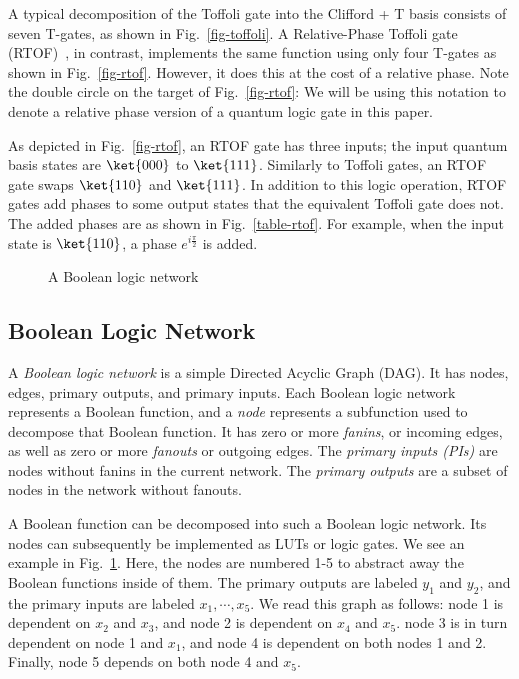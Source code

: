A typical decomposition of the Toffoli gate into the Clifford + T basis
consists of seven T-gates, as shown in Fig.~\ref{fig-toffoli}.
A Relative-Phase Toffoli gate (RTOF)~\cite{bib-selinger-rtof}, in contrast,
implements the same function using only four T-gates as shown in
Fig.~\ref{fig-rtof}. However, it does this at the cost of a relative phase.
Note the double circle on the target of Fig.~\ref{fig-rtof}: We will be
using this notation to denote a relative phase version of a quantum logic
gate in this paper. 

As depicted in Fig.~\ref{fig-rtof}, an RTOF gate has three inputs; the input quantum basis states are $\ket{000}$
to $\ket{111}$. Similarly to Toffoli gates, an RTOF gate swaps $\ket{110}$ and $\ket{111}$. In addition to this
logic operation, RTOF gates add phases to some output states that the equivalent Toffoli gate does not. The added
phases are as shown in Fig.~\ref{table-rtof}. For example, when the input state is $\ket{110}$, a phase $e^{i\frac{\pi}{2}}$ is added.

\begin{figure}[t]
    \centering
    
    \caption{A Boolean logic network}
    \label{fig-lut-network}
\end{figure}

\subsection{Boolean Logic Network}

A {\it Boolean logic network} is a simple Directed Acyclic Graph (DAG). It has nodes, edges, primary outputs, and
primary inputs. Each Boolean logic network represents a Boolean function, and a
\emph{node} represents a subfunction used to decompose that Boolean function. It has zero or more {\it fanins}, or incoming edges, as well as zero or more {\it fanouts} or outgoing edges.
The {\it primary inputs (PIs)} are nodes without fanins in the current network. The {\it primary outputs} are a
subset of nodes in the network without fanouts. 

A Boolean function can be decomposed into such a Boolean logic network. Its nodes can subsequently be
implemented as LUTs or logic gates. We see an example in Fig.~\ref{fig-lut-network}. Here, the nodes are
numbered 1-5 to abstract away the Boolean functions inside of them. The primary outputs are labeled $y_1$ and
$y_2$, and the primary inputs are labeled $x_1,\cdots,x_5$. We read this graph as follows: node 1 is
dependent on $x_2$ and $x_3$, and node 2 is dependent on $x_4$ and $x_5$. node 3 is in turn dependent
on node 1 and $x_1$, and node 4 is dependent on both nodes 1 and 2. Finally, node 5 depends on both
node 4 and $x_5$.

